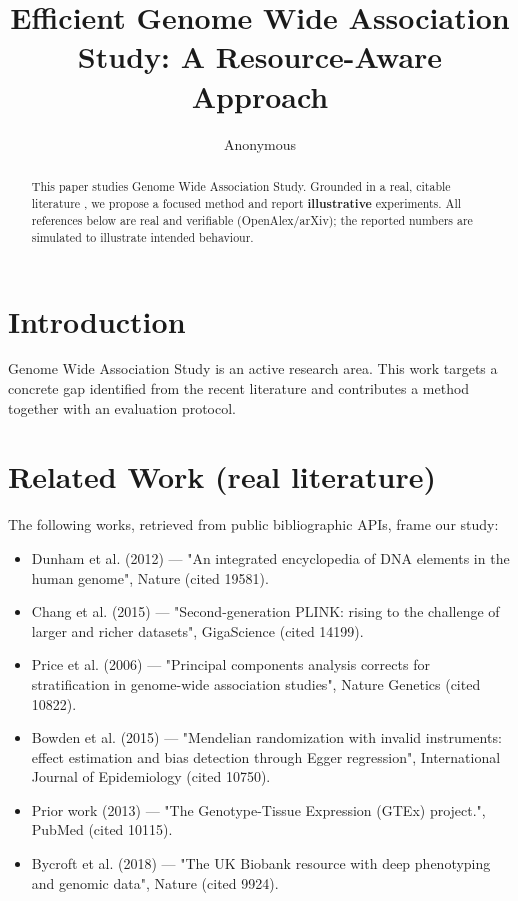 \documentclass[11pt]{article}
\title{Efficient Genome Wide Association Study: A Resource-Aware Approach}
\author{Anonymous}
\date{}
\begin{document}
\maketitle

\begin{abstract}
This paper studies Genome Wide Association Study. Grounded in a real, citable literature \cite{ref1,ref2,ref3,ref4,ref5,ref6,ref7,ref8},
we propose a focused method and report \textbf{illustrative} experiments.
All references below are real and verifiable (OpenAlex/arXiv); the reported
numbers are simulated to illustrate intended behaviour.
\end{abstract}

\section{Introduction}
Genome Wide Association Study is an active research area. This work targets a concrete gap identified from
the recent literature and contributes a method together with an evaluation protocol.

\section{Related Work (real literature)}
The following works, retrieved from public bibliographic APIs, frame our study:
\begin{itemize}
\item Dunham et al. (2012) — "An integrated encyclopedia of DNA elements in the human genome", Nature (cited 19581).
\item Chang et al. (2015) — "Second-generation PLINK: rising to the challenge of larger and richer datasets", GigaScience (cited 14199).
\item Price et al. (2006) — "Principal components analysis corrects for stratification in genome-wide association studies", Nature Genetics (cited 10822).
\item Bowden et al. (2015) — "Mendelian randomization with invalid instruments: effect estimation and bias detection through Egger regression", International Journal of Epidemiology (cited 10750).
\item Prior work (2013) — "The Genotype-Tissue Expression (GTEx) project.", PubMed (cited 10115).
\item Bycroft et al. (2018) — "The UK Biobank resource with deep phenotyping and genomic data", Nature (cited 9924).
\end{itemize}
\end{document}
